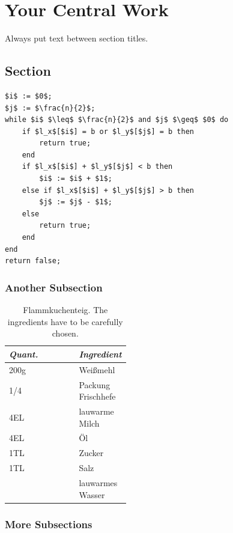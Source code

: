 \chapter{Your Central Work}

Always put text between section titles.

\section{Section}

\begin{lstlisting}[mathescape]
$i$ := $0$;
$j$ := $\frac{n}{2}$;
while $i$ $\leq$ $\frac{n}{2}$ and $j$ $\geq$ $0$ do
	if $l_x$[$i$] = b or $l_y$[$j$] = b then
		return true;
	end
	if $l_x$[$i$] + $l_y$[$j$] < b then
		$i$ := $i$ + $1$;
	else if $l_x$[$i$] + $l_y$[$j$] > b then
		$j$ := $j$ - $1$;
	else
		return true;
	end
end
return false;
\end{lstlisting}


\subsection{Another Subsection}

\begin{table}
    \centering
		\caption[Flammkuchenteig]{Flammkuchenteig. The ingredients have to be carefully chosen.\label{tab:mytable}}
    \begin{tabular}{|l|p{0.4\linewidth}|}
    \hline
    \emph{Quant.} & \emph{Ingredient}\\
    \hline
		200g &Wei{\ss}mehl\\
		1/4  &Packung Frischhefe\\
		4EL  &lauwarme Milch\\
		4EL  &Öl\\
		1TL  &Zucker\\
		1TL  &Salz\\
		&lauwarmes Wasser\\
    \hline
    \end{tabular}    
\end{table}

\subsection{More Subsections}


